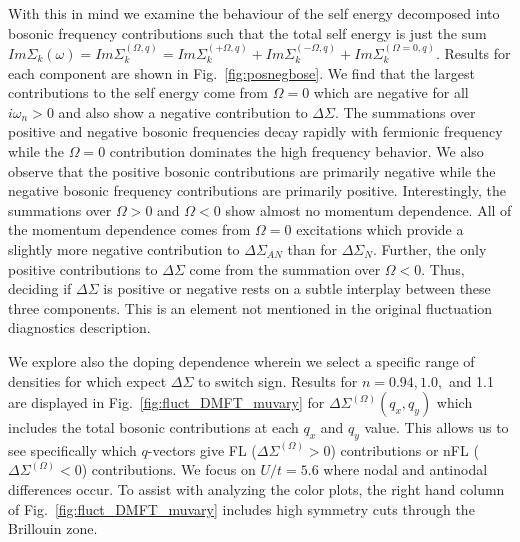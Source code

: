 \documentclass[twocolumn,notitlepage,prb,superscriptaddress,showpacs]{revtex4-1}
\begin{document}
With this in mind we examine the behaviour of the self energy decomposed into bosonic frequency contributions such that the total self energy is just the sum $Im\Sigma_k(\omega)=Im\Sigma_k^{(\Omega,q)}= Im\Sigma_k^{(+ \Omega,q)}+Im\Sigma_k^{(- \Omega,q)} + Im\Sigma_k^{(\Omega=0,q)}$.  Results for each component are shown in Fig.~\ref{fig:posnegbose}.   We find that the largest contributions to the self energy come from $\Omega=0$ which are negative for all $i\omega_n>0$ and also show a negative contribution to $\Delta \Sigma$.   The summations over positive and negative bosonic frequencies decay rapidly with fermionic frequency while the $\Omega=0$ contribution dominates the high frequency behavior.  We also observe that the positive bosonic contributions are primarily negative while the negative bosonic frequency contributions are primarily positive.  Interestingly, the summations over $\Omega>0$ and $\Omega<0$ show almost no momentum dependence.  All of the momentum dependence comes from $\Omega=0$ excitations which provide a slightly more negative contribution to $\Delta \Sigma_{AN}$ than for $\Delta \Sigma_N$. Further, the only positive contributions to $\Delta \Sigma$ come from the summation over $\Omega<0$.  Thus, deciding if $\Delta \Sigma$ is positive or negative rests on a subtle interplay between these three components.   This is an element not mentioned in the original fluctuation diagnostics description.\cite{gunnarsson:2015} 

We explore also the doping dependence wherein we select a specific range of densities for which expect $\Delta \Sigma$ to switch sign. 
Results for $n=0.94, 1.0,$ and 1.1 are displayed in Fig.~\ref{fig:fluct_DMFT_muvary} for $\Delta \Sigma^{(\Omega)}(q_x,q_y)$ which includes the total bosonic contributions at each $q_x$ and $q_y$ value.  
This allows us to see specifically which $q$-vectors give FL ($\Delta \Sigma^{(\Omega)}>0$) contributions or nFL  ($\Delta \Sigma^{(\Omega)}<0$) contributions.  We focus on $U/t=5.6$ where nodal and antinodal differences occur. 
To assist with analyzing the color plots, the right hand column of Fig.~\ref{fig:fluct_DMFT_muvary} includes high symmetry cuts through the Brillouin zone.
\end{document}
